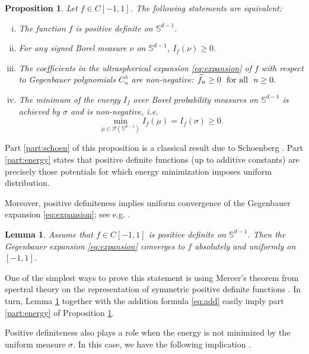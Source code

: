 \documentclass[11pt, leqno]{amsart}
\def\S{\mathbb S}
\newtheorem{lemma}[theorem]{Lemma}
\newtheorem{proposition}[theorem]{Proposition}
\theoremstyle{definition}
\numberwithin{equation}{section}
\begin{document}
\begin{proposition}\label{p:pd}
Let $f \in C[-1,1]$. The following statements are equivalent:
\begin{enumerate}[(i)]
\item The function $f$ is positive definite on $\S^{d-1}$. \vspace{1 mm}
\item For any signed Borel measure $\nu$ on $\S^{d-1}$, $ I_f (\nu) \ge 0.$ \vspace{1 mm}
\item\label{part:schoen} The coefficients in the ultraspherical expansion \eqref{eq:expansion} of $f$ with respect to Gegenbauer polynomials $C_n^\lambda $ are non-negative: $\widehat{f}_n \ge 0 \,\, \textup{ for all } \,\, n\ge 0 .$ \vspace{1 mm}
\item\label{part:energy} The minimum of the energy $I_f$ over Borel probability measures on $\S^{d-1}$ is achieved by $\sigma$ and is  non-negative, i.e. $$\min_{\mu \in \mathcal P (\mathbb S^{d-1} )} I_f (\mu ) = I_f (\sigma) \ge 0. $$
\end{enumerate}
\end{proposition}
Part \eqref{part:schoen} of this proposition is a classical result due to Schoenberg \cite{schoenbergPositive1941}. Part \eqref{part:energy} states that positive definite functions (up to additive constants) are precisely those potentials  for which  energy minimization imposes uniform distribution. 

Moreover, positive definiteness implies uniform convergence of the Gegenbauer expansion \eqref{eq:expansion}; see e.g. \cite{gangolli}.
\begin{lemma}\label{l:absconv}
Assume that $f\in C[-1,1]$ is positive definite on $\mathbb S^{d-1}$.  
Then the Gegenbauer expansion \eqref{eq:expansion} converges to $f$ absolutely and uniformly on $[-1,1]$. 
\end{lemma}
One of the simplest ways to prove this statement is using Mercer's theorem from spectral theory on the representation of symmetric positive definite functions \cite{mercers}. In turn, Lemma \ref{l:absconv} together with the addition formula \eqref{eq:add} easily imply part \eqref{part:energy} of Proposition \ref{p:pd}. 

Positive definiteness also plays a role  when the energy is not minimized by the uniform measure $\sigma$. In this case, we  have the following implication \cite{Bjorck1956,finsterSupport2013}. 
\end{document}
